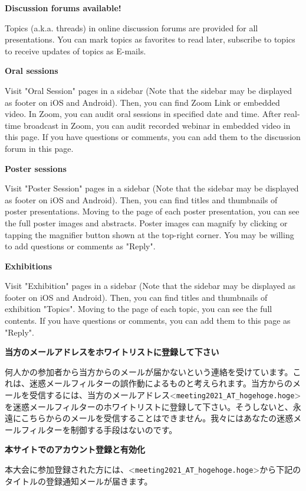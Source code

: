 \documentclass[titlepage,10pt,a4paper,uplatex]{jsbook}
\newenvironment{content}{\begin{shaded}\vspace{-1em}\raggedright\ttfamily\footnotesize\setlength{\baselineskip}{1.4em}}{\end{shaded}\vspace{-1em}}
\renewcommand{\textbf}[1]{{\bfseries\sffamily#1}}
\begin{document}
\begin{content}
\textbf{\Large Discussion forums available!}

Topics (a.k.a. threads) in online discussion forums are provided for all presentations. You can mark topics as favorites to read later, subscribe to topics to receive updates of topics as E-mails.

\textbf{\Large Oral sessions}

Visit "Oral Session" pages in a sidebar (Note that the sidebar may be displayed as footer on iOS and Android). Then, you can find Zoom Link or embedded video. In Zoom, you can audit oral sessions in specified date and time. After real-time broadcast in Zoom, you can audit recorded webinar in embedded video in this page. If you have questions or comments, you can add them to the discussion forum in this page.

\textbf{\Large Poster sessions}

Visit "Poster Session" pages in a sidebar (Note that the sidebar may be displayed as footer on iOS and Android). Then, you can find titles and thumbnails of poster presentations. Moving to the page of each poster presentation, you can see the full poster images and abstracts. Poster images can magnify by clicking or tapping the magnifier button shown at the top-right corner. You may be willing to add questions or comments as "Reply".

\textbf{\Large Exhibitions}

Visit "Exhibition" pages in a sidebar (Note that the sidebar may be displayed as footer on iOS and Android). Then, you can find titles and thumbnails of exhibition "Topics". Moving to the page of each topic, you can see the full contents. If you have questions or comments, you can add them to this page as "Reply".

\textbf{\Large 当方のメールアドレスをホワイトリストに登録して下さい}

何人かの参加者から当方からのメールが届かないという連絡を受けています。これは、迷惑メールフィルターの誤作動によるものと考えられます。当方からのメールを受信するには、当方のメールアドレス{\textless}\texttt{meeting2021\_AT\_hogehoge.hoge}{\textgreater}を迷惑メールフィルターのホワイトリストに登録して下さい。そうしないと、永遠にこちらからのメールを受信することはできません。我々にはあなたの迷惑メールフィルターを制御する手段はないのです。

\textbf{\Large 本サイトでのアカウント登録と有効化}

本大会に参加登録された方には、{\textless}\texttt{meeting2021\_AT\_hogehoge.hoge}{\textgreater}から下記のタイトルの登録通知メールが届きます。


\end{content}
\end{document}
